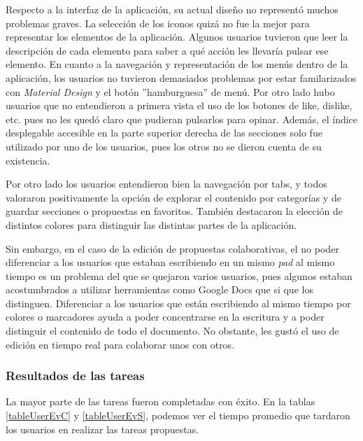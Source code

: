 Respecto a la interfaz de la aplicación, su actual diseño no representó muchos problemas graves. La selección de los iconos quizá no fue la mejor para representar los elementos de la aplicación. Algunos usuarios tuvieron que leer la descripción de cada elemento para saber a qué acción les llevaría pulsar ese elemento. En cuanto a la navegación y representación de los menús dentro de la aplicación, los usuarios no tuvieron demasiados problemas por estar familarizados con \textit{Material Design} y el botón ''hamburguesa'' de menú. Por otro lado hubo usuarios que no entendieron a primera vista el uso de los botones de like, dislike, etc. pues no les quedó claro que pudieran pulsarlos para opinar. Además, el índice desplegable accesible en la parte superior derecha de las secciones solo fue utilizado por uno de los usuarios, pues los otros no se dieron cuenta de su existencia. 

Por otro lado los usuarios entendieron bien la navegación por tabs, y todos valoraron positivamente la opción de explorar el contenido por categorías y de guardar secciones o propuestas en favoritos. También destacaron la elección de distintos colores para distinguir las distintas partes de la aplicación.

Sin embargo, en el caso de la edición de propuestas colaborativas, el no poder diferenciar a los usuarios que estaban escribiendo en un mismo \textit{pad} al mismo tiempo es un problema del que se quejaron varios usuarios, pues algunos estaban acostumbrados a utilizar herramientas como Google Docs que si que los distinguen. Diferenciar a los usuarios que están escribiendo al mismo tiempo por colores o marcadores  ayuda a poder concentrarse en la escritura y a poder distinguir el contenido de todo el documento. No obstante, les gustó el uso de edición en tiempo real para colaborar unos con otros.

\subsubsection{Resultados de las tareas}

La mayor parte de las tareas fueron completadas con éxito. En la tablas \ref{tableUserEvC} y \ref{tableUserEvS}, podemos ver el tiempo promedio que tardaron los usuarios en realizar las tareas propuestas.

